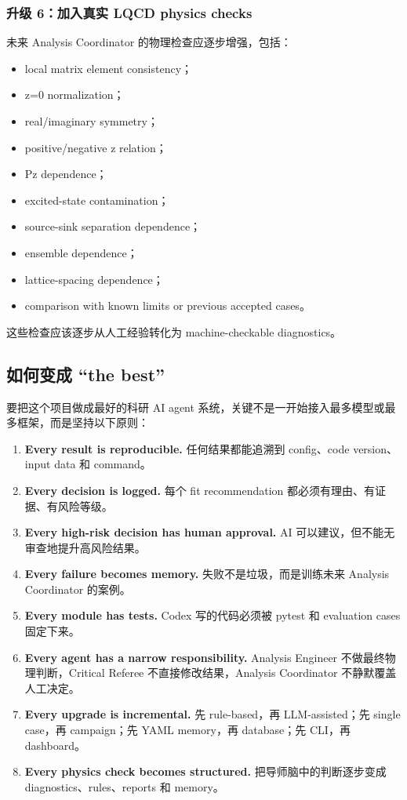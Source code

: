\documentclass[11pt,a4paper,fontset=none]{ctexart}
\begin{document}
\subsubsection{升级 6：加入真实 LQCD physics checks}

未来 Analysis Coordinator 的物理检查应逐步增强，包括：

\begin{itemize}[leftmargin=2em]
  \item local matrix element consistency；
  \item z=0 normalization；
  \item real/imaginary symmetry；
  \item positive/negative z relation；
  \item Pz dependence；
  \item excited-state contamination；
  \item source-sink separation dependence；
  \item ensemble dependence；
  \item lattice-spacing dependence；
  \item comparison with known limits or previous accepted cases。
\end{itemize}

这些检查应该逐步从人工经验转化为 machine-checkable diagnostics。

\subsection{如何变成 ``the best''}

要把这个项目做成最好的科研 AI agent 系统，关键不是一开始接入最多模型或最多框架，而是坚持以下原则：

\begin{enumerate}[leftmargin=2em]
  \item \textbf{Every result is reproducible.} 任何结果都能追溯到 config、code version、input data 和 command。
  \item \textbf{Every decision is logged.} 每个 fit recommendation 都必须有理由、有证据、有风险等级。
  \item \textbf{Every high-risk decision has human approval.} AI 可以建议，但不能无审查地提升高风险结果。
  \item \textbf{Every failure becomes memory.} 失败不是垃圾，而是训练未来 Analysis Coordinator 的案例。
  \item \textbf{Every module has tests.} Codex 写的代码必须被 pytest 和 evaluation cases 固定下来。
  \item \textbf{Every agent has a narrow responsibility.} Analysis Engineer 不做最终物理判断，Critical Referee 不直接修改结果，Analysis Coordinator 不静默覆盖人工决定。
  \item \textbf{Every upgrade is incremental.} 先 rule-based，再 LLM-assisted；先 single case，再 campaign；先 YAML memory，再 database；先 CLI，再 dashboard。
  \item \textbf{Every physics check becomes structured.} 把导师脑中的判断逐步变成 diagnostics、rules、reports 和 memory。
\end{enumerate}
\end{document}

